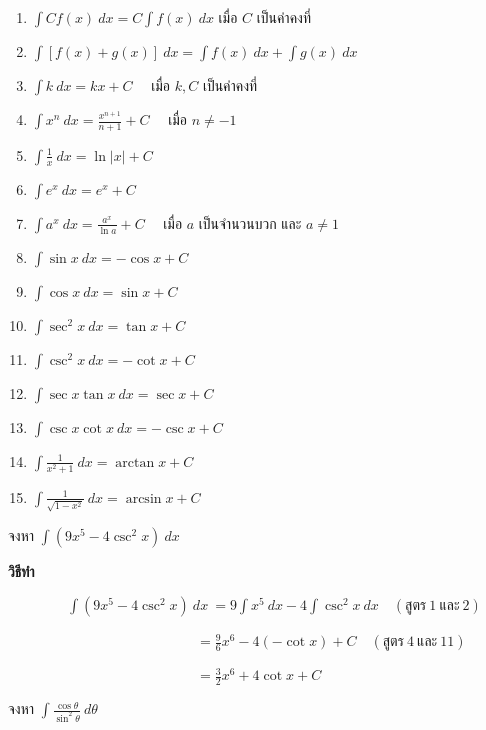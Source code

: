 \documentclass[
]{book}
\begin{document}
\begin{enumerate}
\def\labelenumi{\arabic{enumi}.}
\item
  \(\displaystyle \int C f(x) \ dx = C \int f(x) \ dx\) เมื่อ \(C\)
  เป็นค่าคงที่
\item
  \(\displaystyle \int [f(x)+g(x)] \ dx = \int f(x) \ dx+\int
  g(x) \ dx\)
\item
  \(\displaystyle \int k \ dx = kx+C \quad\) เมื่อ \(k, C\) เป็นค่าคงที่
\item
  \(\displaystyle \int x^{n} \ dx = \frac{x^{n+1}}{n+1}+C
  \quad\) เมื่อ \(n\neq -1\)
\item
  \(\displaystyle \int \frac{1}{x} \ dx = \ln|x|+C\)
\item
  \(\displaystyle \int e^{x} \ dx = e^{x}+C\)
\item
  \(\displaystyle \int a^{x} \ dx = \frac{a^{x}}{ \ln a}+C
  \quad\) เมื่อ \(a\) เป็นจำนวนบวก และ \(a\neq 1\)
\item
  \(\displaystyle \int \sin x \ dx = -\cos x+C\)
\item
  \(\displaystyle \int \cos x \ dx = \sin x+C\)
\item
  \(\displaystyle \int \sec^{2} x \ dx = \tan x+C\)
\item
  \(\displaystyle \int \csc^{2} x \ dx = -\cot x+C\)
\item
  \(\displaystyle \int \sec x \tan x \ dx = \sec x+C\)
\item
  \(\displaystyle \int \csc x \cot x \ dx = -\csc x+C\)
\item
  \(\displaystyle \int \frac{1}{x^{2}+1} \ dx = \arctan x+C\)
\item
  \(\displaystyle \int \frac{1}{\sqrt{1-x^{2}}} \ dx =
  \arcsin x+C\)
\end{enumerate}

จงหา \(\displaystyle \int (9x^{5}-4 \csc^{2} x) \ dx\)

\textbf{วิธีทำ}

\(\qquad \qquad \ \displaystyle \int (9x^{5}-4 \csc^{2} x) \ dx \ = 9\int
x^{5} \ dx -4 \int \csc^{2} x \ dx \quad ( \mbox{สูตร} \ 1 \ \mbox{และ} \ 
2)\)

\(\qquad \qquad \qquad \qquad \qquad \qquad \quad \ \ =\displaystyle
\frac{9}{ 6}x^{6} -4(-\cot x)+C \quad ( \mbox{สูตร} \ 4 \ \mbox{และ} \ 11)\)

\(\qquad \qquad \qquad \qquad \qquad \qquad \quad \ \ =\displaystyle
\frac{3}{2}x^{6}+4\cot x+C\)

จงหา \(\displaystyle \int \frac{\cos \theta}{\sin^{2} \theta}
\ d\theta\)
\end{document}
